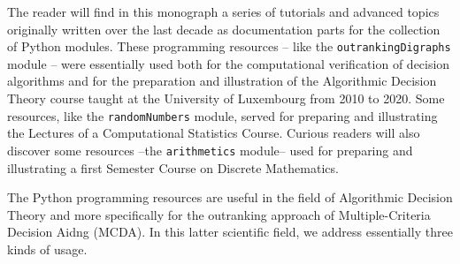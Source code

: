 %
%

\preface






The reader will find in this monograph a series of tutorials and advanced topics originally written over the last decade as documentation parts for the \Digraph collection of Python modules. These programming resources -- like the \texttt{outrankingDigraphs} module -- were essentially used both for the computational verification of decision algorithms and for the preparation and illustration of the Algorithmic Decision Theory course taught at the University of Luxembourg from 2010 to 2020. Some resources, like the \texttt{randomNumbers} module, served for preparing and illustrating the Lectures of a Computational Statistics Course. Curious readers will also discover some resources --the \texttt{arithmetics} module-- used for preparing and illustrating a first Semester Course on Discrete Mathematics.


The \Digraph Python programming resources are useful in the field of Algorithmic Decision Theory and more specifically for the outranking approach of Multiple-Criteria Decision Aidng (MCDA). In this latter scientific field, we address essentially three kinds of usage.

